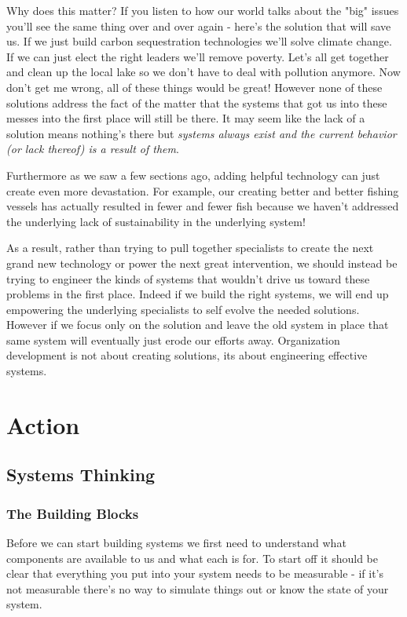 \documentclass[11pt,a5paper]{book}
\begin{document}
Why does this matter? If you listen to how our world talks about the "big" issues you'll see the same thing over and over again - here's the solution that will save us. If we just build carbon sequestration technologies we'll solve climate change. If we can just elect the right leaders we'll remove poverty. Let's all get together and clean up the local lake so we don't have to deal with pollution anymore. Now don't get me wrong, all of these things would be great! However none of these solutions address the fact of the matter that the systems that got us into these messes into the first place will still be there. It may seem like the lack of a solution means nothing's there but \textit{systems always exist and the current behavior (or lack thereof) is a result of them}.
\newline

Furthermore as we saw a few sections ago, adding helpful technology can just create even more devastation. For example, our creating better and better fishing vessels has actually resulted in fewer and fewer fish \cite{meadows} because we haven't addressed the underlying lack of sustainability in the underlying system!
\newline

As a result, rather than trying to pull together specialists to create the next grand new technology or power the next great intervention, we should instead be trying to engineer the kinds of systems that wouldn't drive us toward these problems in the first place. Indeed if we build the right systems, we will end up empowering the underlying specialists to self evolve the needed solutions. However if we focus only on the solution and leave the old system in place that same system will eventually just erode our efforts away. Organization development is not about creating solutions, its about engineering effective systems.

\part{Action}

\chapter{Systems Thinking}
\section{The Building Blocks}
Before we can start building systems we first need to understand what components are available to us and what each is for. To start off it should be clear that everything you put into your system needs to be measurable - if it's not measurable there's no way to simulate things out or know the state of your system. 
\newline
\end{document}
